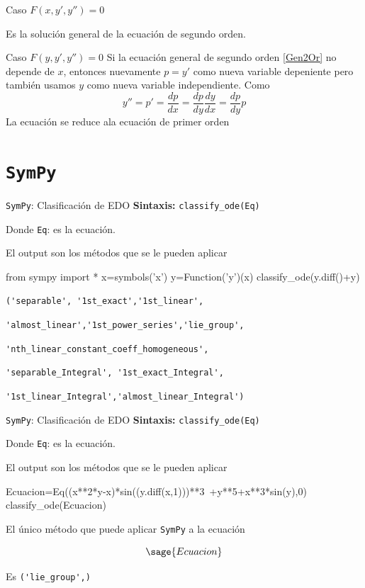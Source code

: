 \documentclass[handout,hyperref={colorlinks=true}]{beamer}
\begin{document}
\begin{frame}{Caso $F(x,y',y'')=0$}
 
Es la solución general de la ecuación de segundo orden.

\end{frame}

\begin{frame}{Caso $F(y,y',y'')=0$}\label{reduc_orden}
Si la ecuación general de segundo orden \eqref{Gen2Or} no depende de $x$, entonces nuevamente $\boxed{p=y'}$ como nueva variable depeniente
pero también usamos $\boxed{y}$ como nueva variable independiente. Como
\[y''=p'=\frac{dp}{dx}=\frac{dp}{dy}\frac{dy}{dx}=\frac{dp}{dy}p\]
La ecuación se reduce ala ecuación de primer orden

\end{frame}

\section{\texttt{SymPy}}



\begin{frame}[fragile]{\texttt{SymPy}: Clasificación de EDO}
\textbf{Sintaxis:} \verb+classify_ode(Eq)+

Donde
\verb+Eq+: es la ecuación.

El output son los métodos que se le pueden aplicar
\begin{sageblock}
from sympy import *
x=symbols('x')
y=Function('y')(x)
classify_ode(y.diff()+y)
\end{sageblock}

\verb+('separable', '1st_exact','1st_linear',+

\verb+'almost_linear','1st_power_series','lie_group',+


\verb+'nth_linear_constant_coeff_homogeneous', +

\verb+'separable_Integral', '1st_exact_Integral',  +

\verb+'1st_linear_Integral','almost_linear_Integral')+

\end{frame}

\begin{frame}[fragile]{\texttt{SymPy}: Clasificación de EDO}
\textbf{Sintaxis:} \verb+classify_ode(Eq)+

Donde
\verb+Eq+: es la ecuación.

El output son los métodos que se le pueden aplicar
\begin{sageblock}
Ecuacion=Eq((x**2*y-x)*sin((y.diff(x,1)))**3\
+y**5+x**3*sin(y),0)
classify_ode(Ecuacion)
\end{sageblock}

El único método que puede aplicar \texttt{SymPy} a la ecuación 

\[\sage{Ecuacion}\]

Es \verb+('lie_group',)+


\end{frame}
\end{document}
